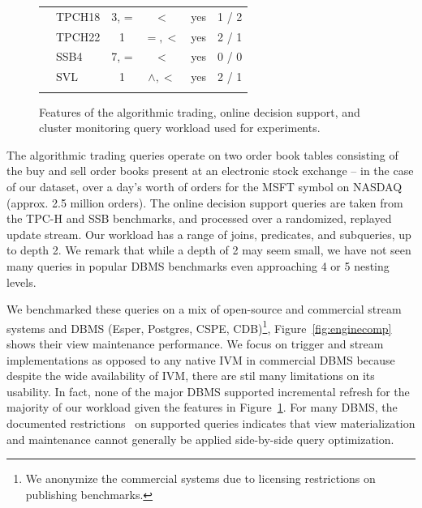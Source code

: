 \begin{figure}[t]
{\begin{center}
\begin{tabular}{ p{0.15cm} | l | c | c | c  | c }
& TPCH18     & 3, =      & $<$           & yes & 1 / 2 \\
& TPCH22     & 1         & $=,<$         & yes & 2 / 1 \\
& SSB4       & 7, =      & $<$           & yes & 0 / 0 \\
\hline
\comment{
& SVL        & 1         & $\wedge, <$   & yes & 2 / 1 \\
}
\end{tabular}
\end{center}
}
\vspace{-4mm}
\caption{Features of the algorithmic trading, online decision support, and
cluster monitoring query workload used for experiments.}
\label{fig:queries}
\vspace{-4mm}
\end{figure}

The algorithmic trading queries operate on two order book tables consisting of
the buy and sell order books present at an electronic stock exchange -- in the
case of our dataset, over a day's worth of orders for the MSFT symbol on NASDAQ
(approx. 2.5 million orders). The online decision support queries are taken from
the TPC-H and SSB benchmarks, and processed over a randomized, replayed update
stream. 
Our workload has a range of joins, predicates, and subqueries, up to depth 2. We
remark that while a depth of 2 may seem small, we have not seen many queries in
popular DBMS benchmarks even approaching 4 or 5 nesting levels.

We benchmarked these queries on a mix of open-source and commercial stream
systems and DBMS (Esper, Postgres, CSPE, CDB)\footnote{We anonymize the
commercial systems due to licensing restrictions on publishing benchmarks.},
Figure~\ref{fig:enginecomp} shows their view maintenance performance.
We focus on trigger and stream implementations as opposed to any native IVM in
commercial DBMS because despite the wide availability of IVM, there are stil
many limitations on its usability.
In fact, none of the major DBMS supported incremental refresh for the
majority of our workload given the features in Figure~\ref{fig:queries}.
For many DBMS, the documented
restrictions~\cite{db2-viewrestrict,mssql-viewrestrict,oracle-viewrestrict} on
supported queries indicates that view materialization and maintenance cannot
generally be applied side-by-side query optimization.

